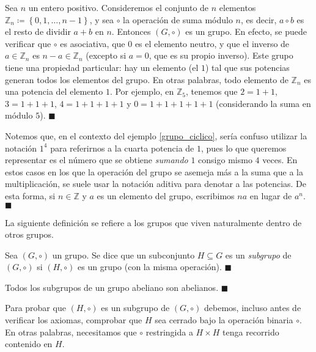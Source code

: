 \begin{example} \label{grupo_ciclico}
Sea $n$ un entero positivo. Consideremos el conjunto de $n$ elementos $\mathbb{Z}_n \coloneq \left\{ 0, 1, \dots, n-1 \right\}$, y sea $\circ$ la operación de suma módulo $n$, es decir, $a \circ b$ es el resto de dividir $a+b$ en $n$. Entonces $(G, \circ)$ es un grupo. En efecto, se puede verificar que $\circ$ es asociativa, que $0$ es el elemento neutro, y que el inverso de $a \in \mathbb{Z}_n$ es $n-a \in \mathbb{Z}_n$ (excepto si $a = 0$, que es su propio inverso).
Este grupo tiene una propiedad particular: hay un elemento (el $1$) tal que sus potencias generan todos los elementos del grupo. En otras palabras, todo elemento de $\mathbb{Z}_n$ es una potencia del elemento $1$. Por ejemplo, en $\mathbb{Z}_5$, tenemos que $2 = 1 + 1$, $3 = 1 + 1 + 1$, $4 = 1 + 1 + 1 + 1$ y $0 = 1 + 1 + 1 + 1 + 1$ (considerando la suma en módulo $5$).
\hfill$\blacksquare$
\end{example}

\begin{remark} Notemos que, en el contexto del ejemplo \ref{grupo_ciclico}, sería confuso utilizar la notación $1^4$ para referirnos a la cuarta potencia de $1$, pues lo que queremos representar es el número que se obtiene \textit{sumando} $1$ consigo mismo $4$ veces. En estos casos en los que la operación del grupo se asemeja más a la suma que a la multiplicación, se suele usar la notación aditiva para denotar a las potencias. De esta forma, si $n \in \mathbb{Z}$ y $a$ es un elemento del grupo, escribimos $n a$ en lugar de $a^n$. \hfill$\blacksquare$
\end{remark}


La siguiente definición se refiere a los grupos que viven naturalmente dentro de otros grupos.

\begin{definition}[Subgrupo]
Sea $(G,\circ)$ un grupo. Se dice que un subconjunto $H \subseteq G$ es un \emph{subgrupo} de $(G,\circ)$ si $(H, \circ)$ es un grupo (con la misma operación). \hfill$\blacksquare$
\end{definition}

\begin{remark}
	Todos los subgrupos de un grupo abeliano son abelianos. \hfill$\blacksquare$
	\end{remark}

Para probar que $(H, \circ)$ es un subgrupo de $(G, \circ)$ debemos, incluso antes de verificar los axiomas, comprobar que $H$ sea cerrado bajo la operación binaria $\circ$. En otras palabras, necesitamos que $\circ$ restringida a $H \times H$ tenga recorrido contenido en $H$. 


